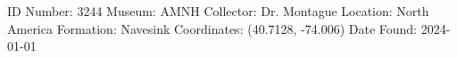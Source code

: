 ID Number: 3244
Museum: AMNH
Collector: Dr. Montague
Location: North America
Formation: Navesink
Coordinates: (40.7128, -74.006)
Date Found: 2024-01-01
